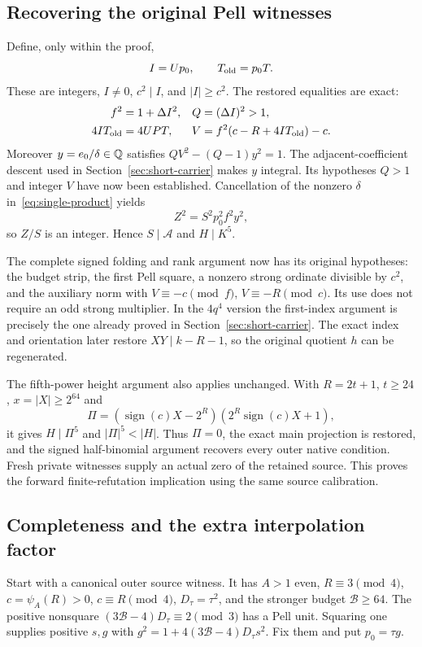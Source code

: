 \subsection{Recovering the original Pell witnesses}
Define, only within the proof,
\[
 I=Up_0,\qquad T_{\rm old}=p_0T.
\]
These are integers, $I\ne0$, $c^2\mid I$, and $|I|\ge c^2$.
The restored equalities are exact:
\begin{align*}
 f^2&=1+\Delta I^2,&Q&=(\Delta I)^2>1,\\
 4IT_{\rm old}&=4UPT,&
 V&=f^2(c-R+4IT_{\rm old})-c.
\end{align*}
Moreover $y=e_0/\delta\in\mathbb Q$ satisfies
$QV^2-(Q-1)y^2=1$. The adjacent-coefficient descent used in
Section~\ref{sec:short-carrier} makes $y$ integral. Its hypotheses
$Q>1$ and integer $V$ have now been established. Cancellation of the
nonzero $\delta$ in~\eqref{eq:single-product} yields
\[
 Z^2=S^2p_0^2f^2y^2,
\]
so $Z/S$ is an integer. Hence $S\mid\mathcal A$ and $H\mid K^5$.

The complete signed folding and rank argument now has its original
hypotheses: the budget strip, the first Pell square, a nonzero strong
ordinate divisible by $c^2$, and the auxiliary norm with
$V\equiv-c\pmod f$, $V\equiv-R\pmod c$. Its use does not require
an odd strong multiplier. In the $4q^4$ version the first-index argument
is precisely the one already proved in Section~\ref{sec:short-carrier}.
The exact index and orientation later restore
$XY\mid k-R-1$, so the original quotient $h$ can be regenerated.

The fifth-power height argument also applies unchanged. With
$R=2t+1$, $t\ge24$, $x=|X|\ge2^{64}$ and
\[
 \Pi=(\operatorname{sign}(c)X-2^R)
          (2^R\operatorname{sign}(c)X+1),
\]
it gives $H\mid\Pi^5$ and $|\Pi|^5<|H|$. Thus $\Pi=0$, the exact
main projection is restored, and the signed half-binomial argument
recovers every outer native condition. Fresh private witnesses supply
an actual zero of the retained source. This proves the forward
finite-refutation implication using the same source calibration.

\subsection{Completeness and the extra interpolation factor}
Start with a canonical outer source witness. It has $A>1$ even,
$R\equiv3\pmod4$, $c=\psi_A(R)>0$, $c\equiv R\pmod4$,
$D_\tau=\tau^2$, and the stronger budget $\mathcal B\ge64$.
The positive nonsquare $(3\mathcal B-4)D_\tau\equiv2\pmod3$
has a Pell unit. Squaring one supplies positive $s,g$ with
$g^2=1+4(3\mathcal B-4)D_\tau s^2$. Fix them and put $p_0=\tau g$.

